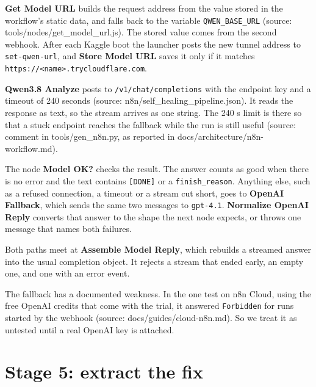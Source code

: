 \textbf{Get Model URL} builds the request address from the value stored in the workflow's static data, and falls back to the variable \texttt{QWEN\_\allowbreak{}BASE\_\allowbreak{}URL} (source: tools/\allowbreak{}nodes/\allowbreak{}get\_\allowbreak{}model\_\allowbreak{}url.js). The stored value comes from the second webhook. After each Kaggle boot the launcher posts the new tunnel address to \texttt{set-\allowbreak{}qwen-\allowbreak{}url}, and \textbf{Store Model URL} saves it only if it matches \texttt{https:\allowbreak{}/\allowbreak{}/\allowbreak{}\textless{}name\textgreater{}.\allowbreak{}trycloudflare.\allowbreak{}com}.

\textbf{Qwen3.8 Analyze} posts to \texttt{/\allowbreak{}v1/\allowbreak{}chat/\allowbreak{}completions} with the endpoint key and a timeout of 240 seconds (source: n8n/\allowbreak{}self\_\allowbreak{}healing\_\allowbreak{}pipeline.json). It reads the response as text, so the stream arrives as one string. The 240 s limit is there so that a stuck endpoint reaches the fallback while the run is still useful (source: comment in tools/\allowbreak{}gen\_\allowbreak{}n8n.py, as reported in docs/\allowbreak{}architecture/\allowbreak{}n8n-workflow.md).

The node \textbf{Model OK?} checks the result. The answer counts as good when there is no error and the text contains \texttt{[DONE]} or a \texttt{finish\_\allowbreak{}reason}. Anything else, such as a refused connection, a timeout or a stream cut short, goes to \textbf{OpenAI Fallback}, which sends the same two messages to \texttt{gpt-\allowbreak{}4.\allowbreak{}1}. \textbf{Normalize OpenAI Reply} converts that answer to the shape the next node expects, or throws one message that names both failures.

Both paths meet at \textbf{Assemble Model Reply}, which rebuilds a streamed answer into the usual completion object. It rejects a stream that ended early, an empty one, and one with an error event.

The fallback has a documented weakness. In the one test on n8n Cloud, using the free OpenAI credits that come with the trial, it answered \texttt{Forbidden} for runs started by the webhook (source: docs/\allowbreak{}guides/\allowbreak{}cloud-n8n.md). So we treat it as untested until a real OpenAI key is attached.

\section{Stage 5: extract the fix}

